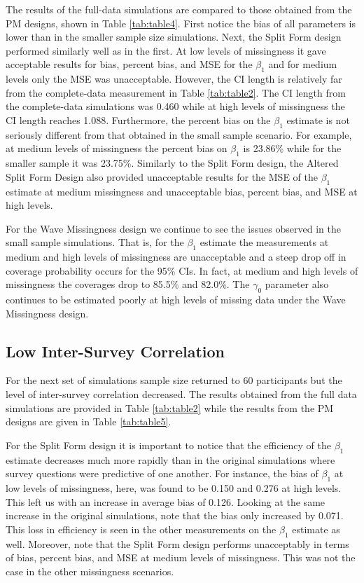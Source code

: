 \documentclass{svjour3}                     %
\begin{document}
The results of the full-data simulations are compared to those obtained from the PM designs, shown in Table \ref{tab:table4}. First notice the bias of all parameters is lower than in the smaller sample size simulations. Next, the Split Form design performed similarly well as in the first. At low levels of missingness it gave acceptable results for bias, percent bias, and MSE for the $\beta_1$ and for medium levels only the MSE was unacceptable. However, the CI length is relatively far from the complete-data measurement in Table \ref{tab:table2}. The CI length from the complete-data simulations was 0.460 while at high levels of missingness the CI length reaches 1.088. Furthermore, the percent bias on the $\beta_1$ estimate is not seriously different from that obtained in the small sample scenario. For example, at medium levels of missingness the percent bias on $\beta_1$ is 23.86\% while for the smaller sample it was 23.75\%.
Similarly to the Split Form design, the Altered Split Form Design also provided unacceptable results for the MSE of the $\beta_1$ estimate at medium missingness and unacceptable bias, percent bias, and MSE at high levels.  \par
For the Wave Missingness design we continue to see the issues observed in the small sample simulations. That is, for the $\beta_1$ estimate the measurements at medium and high levels of missingness are unacceptable and a steep drop off in coverage probability occurs for the 95\% CIs. In fact, at medium and high levels of missingness the coverages drop to 85.5\% and 82.0\%. The $\gamma_0$ parameter also continues to be estimated poorly at high levels of missing data under the Wave Missingness design. \par


\subsection{Low Inter-Survey Correlation}
\label{sec:3.3}
For the next set of simulations sample size returned to 60 participants but the level of inter-survey correlation decreased. The results obtained from the full data simulations are provided in Table \ref{tab:table2} while the results from the PM designs are given in Table \ref{tab:table5}. \par

For the Split Form design it is important to notice that the efficiency of the $\beta_1$ estimate decreases much more rapidly than in the original simulations where survey questions were predictive of one another. For instance, the bias of $\beta_1$ at low levels of missingness, here, was found to be 0.150 and 0.276 at high levels. This left us with an increase in average bias of 0.126. Looking at the same increase in the original simulations, note that the bias only increased by 0.071. This loss in efficiency is seen in the other measurements on the $\beta_1$ estimate as well. Moreover, note that the Split Form design performs unacceptably in terms of bias, percent bias, and MSE at medium levels of missingness. This was not the case in the other missingness scenarios. \par
\end{document}

